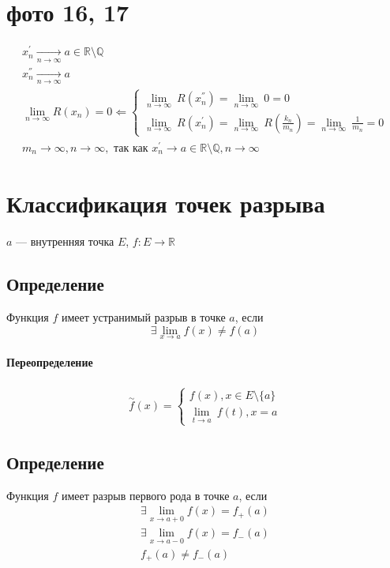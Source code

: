 \documentclass{article}
\begin{document}
\section{фото 16, 17}

\begin{gather*}
    x_n^{'}  \underset{n \to \infty}{\longrightarrow} a \in \mathbb{R} \setminus \mathbb{Q} \\
    x_n^{''} \underset{n \to \infty}{\longrightarrow} a \\
    \lim_{n \to \infty} R(x_n) = 0 \Leftarrow
    \begin{cases}
        \underset{n \to \infty}{\lim} ~ R(x_n^{''}) = \underset{n \to \infty}{\lim} ~ 0 = 0 \\
        \underset{n \to \infty}{\lim} ~ R(x_n^{'})  = \underset{n \to \infty}{\lim} ~ R \left( \frac{k_n}{m_n} \right) =
        \underset{n \to \infty}{\lim} ~ \frac{1}{m_n} = 0
    \end{cases} \\
    m_n \to \infty, n \to \infty, \text{ так как } x_n^{'} \to a \in \mathbb{R} \setminus \mathbb{Q}, n \to \infty
\end{gather*}



\section{Классификация точек разрыва}

$a$ --- внутренняя точка $E$, $f: E \rightarrow \mathbb{R}$

\subsection{Определение}
Функция $f$ имеет устранимый разрыв в точке $a$, если
\[
    \exists \lim_{x \to a} f(x) \neq f(a)
\]

\paragraph{Переопределение}
\begin{gather*}
    \overset{\sim}{f} (x) =
    \begin{cases}
        f(x), x \in E \setminus \{a\} \\
        \underset{t \to a}{\lim} ~ f(t), x = a
    \end{cases}
\end{gather*}


\subsection{Определение}
Функция $f$ имеет разрыв первого рода в точке $a$, если
\begin{gather*}
    \exists \lim_{x \to a + 0} f(x) = f_+(a) \\
    \exists \lim_{x \to a - 0} f(x) = f_-(a) \\
    f_+(a) \neq f_-(a)
\end{gather*}
\end{document}
